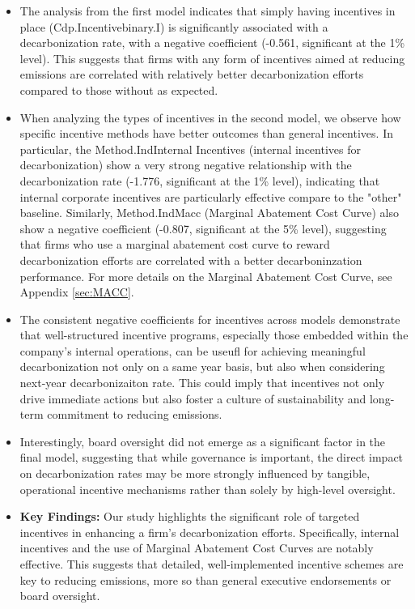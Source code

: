 \begin{itemize}
    \item The analysis from the first model indicates that simply having incentives in place (Cdp.Incentivebinary.I) is significantly associated with a decarbonization rate, with a negative coefficient (-0.561, significant at the 1\% level). This suggests that firms with any form of incentives aimed at reducing emissions are correlated with relatively better decarbonization efforts compared to those without as expected.

    \item When analyzing the types of incentives in the second model, we observe how specific incentive methods have better outcomes than general incentives. In particular, the Method.IndInternal Incentives (internal incentives for decarbonization) show a very strong negative relationship with the decarbonization rate (-1.776, significant at the 1\% level), indicating that internal corporate incentives are particularly effective compare to the "other" baseline. Similarly, Method.IndMacc (Marginal Abatement Cost Curve) also show a negative coefficient (-0.807, significant at the 5\% level), suggesting that firms who use a marginal abatement cost curve to reward decarbonization efforts are correlated with a better decarboninzation performance. For more details on the Marginal Abatement Cost Curve, see Appendix \ref{sec:MACC}.


    \item The consistent negative coefficients for incentives across models demonstrate that well-structured incentive programs, especially those embedded within the company's internal operations, can be useufl  for achieving meaningful decarbonization not only on a same year basis, but also when considering next-year decarbonizaiton rate. This could imply that incentives not only drive immediate actions but also foster a culture of sustainability and long-term commitment to reducing emissions.

    \item Interestingly, board oversight did not emerge as a significant factor in the final model, suggesting that while governance is important, the direct impact on decarbonization rates may be more strongly influenced by tangible, operational incentive mechanisms rather than solely by high-level oversight.
    \item \textbf{Key Findings:} Our study highlights the significant role of targeted incentives in enhancing a firm's decarbonization efforts. Specifically, internal incentives and the use of Marginal Abatement Cost Curves are notably effective. This suggests that detailed, well-implemented incentive schemes are key to reducing emissions, more so than general executive endorsements or board oversight.

\end{itemize}



